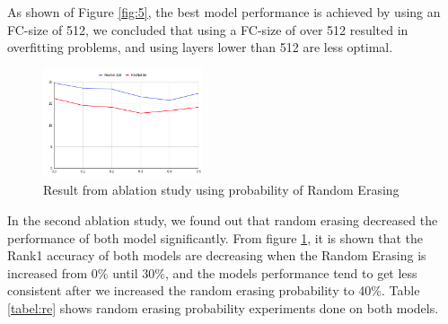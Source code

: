 \documentclass[conference]{IEEEtran}
\begin{document}
    As shown of Figure \ref{fig:5}, the best model performance is achieved by using an FC-size of 512, we concluded that using a FC-size of over 512 resulted in overfitting problems, and using layers lower than 512 are less optimal.
    
    \begin{figure}[h!] \centering
    	\includegraphics[width=0.42\textwidth]{img/HasilRandomErasing.png}
    	\caption{Result from ablation study using probability of Random Erasing}
    	\label{fig:re}
    \end{figure}
    
    In the second ablation study, we found out that random erasing decreased the performance of both model significantly. From figure \ref{fig:re}, it is shown that the Rank1 accuracy of both models are decreasing when the Random Erasing is increased from 0\% until 30\%, and the models performance tend to get less consistent after we increased the random erasing probability to 40\%. Table \ref{tabel:re} shows random erasing probability experiments done on both models.
	
\end{document}
